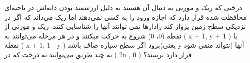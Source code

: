 \p
درختی که ریک و مورتی به دنبال آن هستند به دلیل ارزشمند بودن دانه‌اش در ناحیه‌ای محافظت شده قرار دارد که اجازه ورود را به کسی نمی‌دهند اما ریک می‌داند که اگر در نزدیکی سطح زمین پرواز کند رادارها نمی توانند آنها را شناسایی کنند. ریک  و مورتی از نقطه (0، 0) شروع به حرکت میکنند و در هر مرحله می‌توانند به ( x + 1, y + 1 )  یا نقطه ( x + 1, 1 - y ) برود اگر سطح سیاره صاف باشد(یعنی y نتواند منفی شود) آنها به چند طریق می‌توانند به درخت که در ( 2n , 0 ) قرار دارد برسند؟

